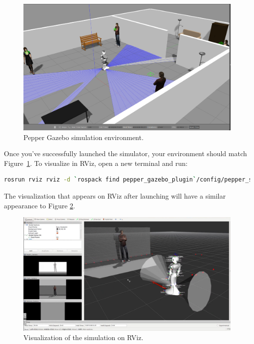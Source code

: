\documentclass{CSSRforAfrica}
\begin{document}
{\begin{enumerate}
\begin{enumerate}[leftmargin=0pt,labelsep=0.5em]
\begin{figure}[!hbpt]
\centering
\includegraphics[scale=0.25]{./images/gazebo-screenshot.png}
\caption{Pepper Gazebo simulation environment.}
\label{fig:gazebo-sim}
\end{figure}

\noindent Once you’ve successfully launched the simulator, your environment should match Figure~\ref{fig:gazebo-sim}. To visualize in RViz, open a new terminal and run:

\begin{lstlisting}[style=withoutNumbering, language=bash]
rosrun rviz rviz -d `rospack find pepper_gazebo_plugin`/config/pepper_sensors.rviz
\end{lstlisting}
\end{enumerate}
\end{enumerate}

\newpage
The visualization that appears on RViz after launching will have a similar appearance to Figure \ref{fig:rviz}.

\begin{figure}[!hbpt]
\centering
\includegraphics[scale=0.40]{./images/rviz.png}
\caption{Visualization of the simulation on RViz.}
\label{fig:rviz}
\end{figure}



}
\end{document}
